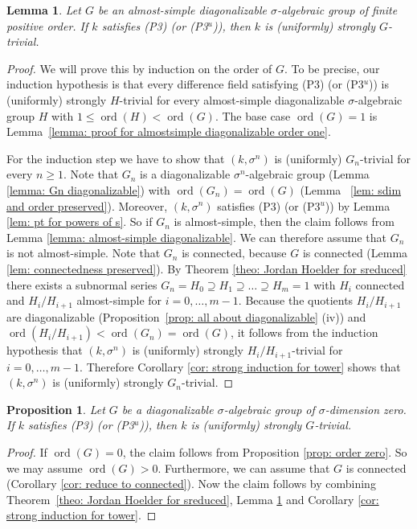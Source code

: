 \documentclass[oneside,reqno]{amsart}
\newtheorem{lemma}[theo]{Lemma}
\newtheorem{prop}[theo]{Proposition}
\theoremstyle{definition}
\newcommand{\ord}{\operatorname{ord}}
\newcommand{\s}{\sigma}
\newcommand{\pt}{{\rm{(P3$^u$)}}}
\newcommand{\ptweak}{{\rm{(P3)}}}
\begin{document}
\begin{lemma} \label{lem: almost simple diagonalizable}
	Let $G$ be an almost-simple diagonalizable $\s$-algebraic group of finite positive order. If $k$ satisfies \ptweak{} (or \pt{}), then $k$ is (uniformly) strongly $G$-trivial.
\end{lemma}
\begin{proof}
	We will prove this by induction on the order of $G$. To be precise, our induction hypothesis is that every difference field satisfying \ptweak{} (or \pt{}) is (uniformly) strongly $H$-trivial for every almost-simple diagonalizable $\s$-algebraic group $H$ with $1\leq\ord(H)<\ord(G)$. The base case $\ord(G)=1$ is Lemma~\ref{lemma: proof for almostsimple diagonalizable order one}.
	
	
	
	For the induction step we have to show that $(k,\s^n)$ is (uniformly) $G_n$-trivial for every $n\geq 1$. Note that $G_n$ is a diagonalizable $\s^n$-algebraic group (Lemma \ref{lemma: Gn diagonalizable}) with $\ord(G_n)=\ord(G)$ (Lemma~ \ref{lem: sdim and order preserved}). Moreover, $(k,\s^n)$ satisfies \ptweak{} (or \pt{}) by Lemma \ref{lem: pt for powers of s}. So if $G_n$ is almost-simple, then the claim follows from Lemma \ref{lemma: almost-simple diagonalizable}. We can therefore assume that $G_n$ is not almost-simple. Note that $G_n$ is connected, because $G$ is connected (Lemma \ref{lem: connectedness preserved}). By Theorem \ref{theo: Jordan Hoelder for sreduced} there exists a subnormal series $G_n=H_0\supseteq H_1\supseteq \ldots\supseteq H_m=1$ with $H_i$ connected and $H_i/H_{i+1}$ almost-simple for $i=0,\ldots, m-1$. Because the quotients $H_i/H_{i+1}$ are diagonalizable (Proposition~\ref{prop: all about diagonalizable} (iv)) and $\ord(H_i/H_{i+1})<\ord(G_n)=\ord(G)$, it follows from the induction hypothesis that $(k,\s^n)$ is (uniformly) strongly $H_i/H_{i+1}$-trivial for $i=0,\ldots,m-1$. Therefore Corollary \ref{cor: strong induction for tower} shows that $(k,\s^n)$ is (uniformly) strongly $G_n$-trivial.
\end{proof}	


\begin{prop} \label{prop: proof for diagonalizable}
	Let $G$ be a diagonalizable $\s$-algebraic group of $\s$-dimension zero. If $k$ satisfies \ptweak{} (or \pt{}), then $k$ is (uniformly) strongly $G$-trivial.
\end{prop}	
\begin{proof}
If $\ord(G)=0$, the claim follows from Proposition \ref{prop: order zero}. So we may assume $\ord(G)>0$. Furthermore, we can assume that $G$ is connected (Corollary \ref{cor: reduce to connected}). Now the claim follows by combining Theorem~\ref{theo: Jordan Hoelder for sreduced}, Lemma \ref{lem: almost simple diagonalizable} and Corollary \ref{cor: strong induction for tower}.
\end{proof}	
\end{document}
